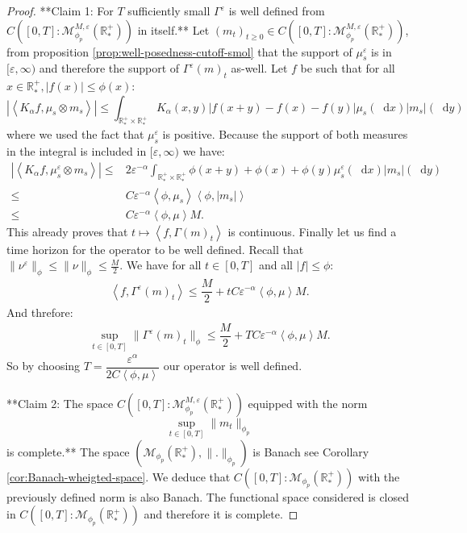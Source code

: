 \documentclass[11pt,a4paper]{article}
\newcommand{\RRP}{\mathbb{R}^+_*}
\newcommand{\MC}{\mathcal{M}}
\newcommand{\Proc}[1]{\left(#1\right)_{t\geq 0}}
\newcommand{\brac}[1]{\left\langle#1\right\rangle}
\newcommand{\dd}{\mathop{}\!\mathrm{d}}
\begin{document}
\begin{proof}
    **Claim 1: For $T$ sufficiently small $\Gamma^\varepsilon$ is well defined from \(C\left([0,T]:\MC^{M,\varepsilon}_{\phi_p}\left(\RRP\right) \right) \) in itself.** Let $\Proc{m_t} \in C\left([0,T]:\MC^{M,\varepsilon}_{\phi_p}\left(\RRP\right) \right)$, from proposition \ref{prop:well-posedness-cutoff-smol} that the support of $\mu^\varepsilon_s$ is in $[\varepsilon,\infty)$ and therefore the support of $\Gamma^\varepsilon(m)_t$ as-well. Let $f$ be such that for all $x\in \RRP, |f(x)| \leq \phi(x)$:
    \[ \left|\brac{K_\alpha f,\mu_s\otimes m_s}\right| \leq \int_{\RRP\times \RRP} K_\alpha(x,y) \left|f(x+y) - f(x) -f(y)\right| \mu_s(\dd x)|m_s|(\dd y)
    \]
    where we used the fact that $\mu^\varepsilon_s $ is positive. Because the support of both measures in the integral is included in $[\varepsilon,\infty)$ we have:
    \begin{align*}
        \left|\brac{K_\alpha f,\mu^\varepsilon_s\otimes m_s}\right| \leq& 2\varepsilon^{-\alpha} \int_{\RRP\times \RRP} \phi(x+y) + \phi(x) + \phi(y)\mu^\varepsilon_s(\dd x)|m_s|(\dd y) \\
        \leq& C\varepsilon^{-\alpha}\brac{\phi,\mu_s} \brac{\phi,|m_s|}\\
        \leq& C\varepsilon^{-\alpha}\brac{\phi,\mu} M.
    \end{align*}
    This already proves that $t\mapsto \brac{f,\Gamma(m)_t}$ is continuous. Finally let us find a time horizon for the operator to be well defined. Recall that $\| \nu^\varepsilon\|_{\phi} \leq \| \nu\|_{\phi} \leq \frac{M}{2}$. We have for all $t \in [0,T]$ and all $|f|\leq \phi$:
    \begin{align*}
        \brac{f,\Gamma^\varepsilon(m)_t} \leq \dfrac{M}{2} + tC\varepsilon^{-\alpha}\brac{\phi,\mu} M.
    \end{align*}
    And threfore:
    \begin{align*}
        \sup\limits_{t\in [0,T]} \| \Gamma^\varepsilon(m)_t\|_{\phi} \leq \dfrac{M}{2} + TC\varepsilon^{-\alpha}\brac{\phi,\mu} M.
    \end{align*}
    So by choosing $T = \dfrac{\varepsilon^{\alpha}}{2C\brac{\phi,\mu}}$ our operator is well defined.

    **Claim 2: The space \(C\left([0,T]:\MC^{M,\varepsilon}_{\phi_p}\left(\RRP\right) \right) \) equipped with the norm 
     \[
    \sup\limits_{t \in [0,T]} \|m_t\|_{\phi_p}
    \]
    is complete.** The space \(\left(\MC_{\phi_p}\left(\RRP\right),\|.\|_{\phi_p}\right)\) is Banach see Corollary \ref{cor:Banach-wheigted-space}. We deduce that \(C\left([0,T]:\MC_{\phi_p}\left(\RRP\right) \right) \) with the previously defined norm is also Banach. The functional space considered is closed in \(C\left([0,T]:\MC_{\phi_p}\left(\RRP\right) \right) \) and therefore it is complete.  
    

\end{proof}
\end{document}
